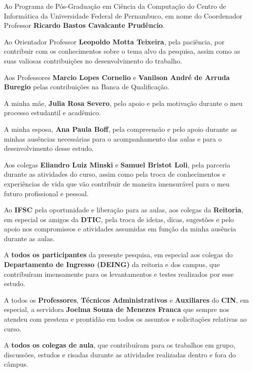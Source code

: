 \begin{agradecimentos}
Ao Programa de Pós-Graduação em Ciência da Computação do Centro de Informática da Universidade Federal de Pernambuco, em nome do Coordenador Professor \textbf{Ricardo Bastos Cavalcante Prudêncio}.

Ao Orientador Professor \textbf{Leopoldo Motta Teixeira}, pela paciência, por contribuir com os conhecimentos sobre o tema alvo da pesquisa, assim como as suas valiosas contribuições no desenvolvimento do trabalho.

Aos Professores \textbf{Marcio Lopes Cornelio} e \textbf{Vanilson André de Arruda Buregio} pelas contribuições na Banca de Qualificação.

A minha mãe, \textbf{Julia Rosa Severo}, pelo apoio e pela motivação durante o meu processo estudantil e acadêmico.

A minha esposa, \textbf{Ana Paula Boff}, pela compreensão e pelo apoio durante as minhas ausências necessárias para o acompanhamento das aulas e para o desenvolvimento desse estudo.

Aos colegas \textbf{Eliandro Luiz Minski} e \textbf{Samuel Bristot Loli}, pela parceria durante as atividades do curso, assim como pela troca de conhecimentos e experiências de vida que vão contribuir de maneira imensurável para o meu futuro profissional e pessoal.

Ao \textbf{IFSC} pela oportunidade e liberação para as aulas, aos colegas da \textbf{Reitoria}, em especial os amigos da \textbf{DTIC}, pela troca de ideias, dicas, sugestões e pelo apoio nos compromissos e atividades assumidas em função da minha ausência durante as aulas.

A \textbf{todos os participantes} da presente pesquisa, em especial aos colegas do \textbf{Departamento de Ingresso (DEING)} da reitoria e dos campus, que contribuíram imensamente para os levantamentos e testes realizados por esse estudo.

A todos os \textbf{Professores}, \textbf{Técnicos Administrativos} e \textbf{Auxiliares} do \textbf{CIN}, em especial, a servidora \textbf{Joelma Souza de Menezes Franca} que sempre nos atendeu com presteza e prontidão em todos os assuntos e solicitações relativas ao curso.

A \textbf{todos os colegas de aula}, que contribuíram para os trabalhos em grupo, discussões, estudos e risadas durante as atividades realizadas dentro e fora do câmpus. 




\end{agradecimentos}